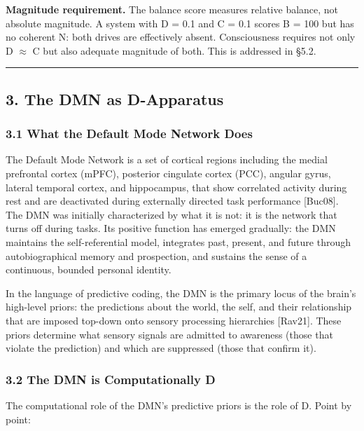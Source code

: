 \documentclass[
  11pt,
  letterpaper,
]{article}
\begin{document}
\textbf{Magnitude requirement.} The balance score measures relative
balance, not absolute magnitude. A system with D = 0.1 and C = 0.1
scores B = 100 but has no coherent N: both drives are effectively
absent. Consciousness requires not only D \(\approx\) C but also
adequate magnitude of both. This is addressed in §5.2.

\begin{center}\rule{0.5\linewidth}{0.5pt}\end{center}

\subsection{3. The DMN as D-Apparatus}\label{the-dmn-as-d-apparatus}

\subsubsection{3.1 What the Default Mode Network
Does}\label{what-the-default-mode-network-does}

The Default Mode Network is a set of cortical regions including the
medial prefrontal cortex (mPFC), posterior cingulate cortex (PCC),
angular gyrus, lateral temporal cortex, and hippocampus, that show
correlated activity during rest and are deactivated during externally
directed task performance {[}Buc08{]}. The DMN was initially
characterized by what it is not: it is the network that turns off during
tasks. Its positive function has emerged gradually: the DMN maintains
the self-referential model, integrates past, present, and future through
autobiographical memory and prospection, and sustains the sense of a
continuous, bounded personal identity.

In the language of predictive coding, the DMN is the primary locus of
the brain's high-level priors: the predictions about the world, the
self, and their relationship that are imposed top-down onto sensory
processing hierarchies {[}Rav21{]}. These priors determine what sensory
signals are admitted to awareness (those that violate the prediction)
and which are suppressed (those that confirm it).

\subsubsection{3.2 The DMN is Computationally
D}\label{the-dmn-is-computationally-d}

The computational role of the DMN's predictive priors is the role of D.
Point by point:
\end{document}

